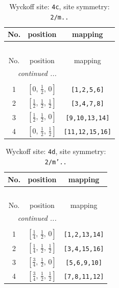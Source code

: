 \documentclass[fleqn,8pt]{jsarticle}
\begin{document}
\renewcommand{\arraystretch}{1.2}
\begin{longtable}{ccc}
\caption{Wyckoff site: {\tt 4c}, site symmetry: {\tt 2/m..}}
 \\
 \hline \hline
No. & position & mapping \\ \hline \endfirsthead

\multicolumn{2}{l}{\tablename\ \thetable{}} \\
 \hline \hline
No. & position & mapping \\ \hline \endhead

 \hline \hline
\multicolumn{2}{r}{\footnotesize\it continued ...} \\ \endfoot

 \hline \hline
\multicolumn{2}{r}{} \\ \endlastfoot

1 & $\left[ 0,\, \frac{1}{2},\, 0 \right]$ & {\tt [1,2,5,6]} \\ \hline
2 & $\left[ \frac{1}{2},\, \frac{1}{2},\, \frac{1}{2} \right]$ & {\tt [3,4,7,8]} \\ \hline
3 & $\left[ \frac{1}{2},\, \frac{1}{2},\, 0 \right]$ & {\tt [9,10,13,14]} \\ \hline
4 & $\left[ 0,\, \frac{1}{2},\, \frac{1}{2} \right]$ & {\tt [11,12,15,16]} \\
\end{longtable}
\renewcommand{\arraystretch}{1.2}
\begin{longtable}{ccc}
\caption{Wyckoff site: {\tt 4d}, site symmetry: {\tt 2/m'..}}
 \\
 \hline \hline
No. & position & mapping \\ \hline \endfirsthead

\multicolumn{2}{l}{\tablename\ \thetable{}} \\
 \hline \hline
No. & position & mapping \\ \hline \endhead

 \hline \hline
\multicolumn{2}{r}{\footnotesize\it continued ...} \\ \endfoot

 \hline \hline
\multicolumn{2}{r}{} \\ \endlastfoot

1 & $\left[ \frac{1}{4},\, \frac{1}{2},\, 0 \right]$ & {\tt [1,2,13,14]} \\ \hline
2 & $\left[ \frac{1}{4},\, \frac{1}{2},\, \frac{1}{2} \right]$ & {\tt [3,4,15,16]} \\ \hline
3 & $\left[ \frac{3}{4},\, \frac{1}{2},\, 0 \right]$ & {\tt [5,6,9,10]} \\ \hline
4 & $\left[ \frac{3}{4},\, \frac{1}{2},\, \frac{1}{2} \right]$ & {\tt [7,8,11,12]} \\
\end{longtable}
\end{document}
